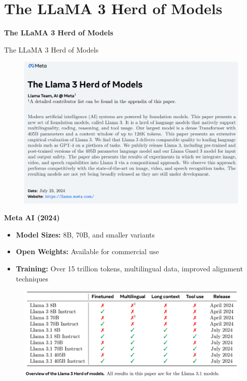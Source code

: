 \section{The LLaMA 3 Herd of Models}
\begin{frame}{}
    \LARGE \textbf{The LLaMA 3 Herd of Models}
\end{frame}

\begin{frame}[allowframebreaks]{The LLaMA 3 Herd of Models}
    \begin{figure}
        \centering
        \includegraphics[height=0.88\textheight,width=1.08\textwidth,keepaspectratio]{images/recent-advance/llama-3-paper.png}
    \end{figure}
\framebreak
    \textbf{Meta AI (2024)}

    \begin{itemize}
        \item \textbf{Model Sizes:} 8B, 70B, and smaller variants
        \item \textbf{Open Weights:} Available for commercial use
        \item \textbf{Training:} Over 15 trillion tokens, multilingual data, improved alignment techniques
    \end{itemize}

\framebreak

    \begin{figure}
        \centering
        \includegraphics[height=0.88\textheight,width=1.08\textwidth,keepaspectratio]{images/recent-advance/llama-3-models.png}
    \end{figure}


\end{frame}
